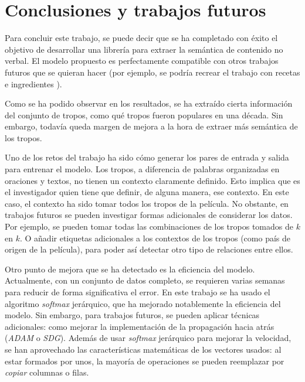 \chapter{Conclusiones y trabajos futuros}

Para concluir este trabajo, se puede decir que se ha completado con éxito el objetivo de desarrollar una librería
para extraer la semántica de contenido no verbal. El modelo propuesto es perfectamente compatible con otros trabajos
futuros que se quieran hacer (por ejemplo, se podría recrear el trabajo con recetas e ingredientes \cite{kazama2018neural}).

Como se ha podido observar en los resultados, se ha extraído cierta información del conjunto de tropos,
como qué tropos fueron populares en una década. Sin embargo, todavía
queda margen de mejora a la hora de extraer más semántica de los tropos.

Uno de los retos del trabajo ha sido cómo generar los pares de entrada y salida para entrenar el modelo. Los tropos, a diferencia de palabras organizadas en oraciones y textos,
no tienen un contexto claramente definido. Esto implica que es el investigador quien tiene que definir, de alguna manera, ese contexto. En este caso, el contexto ha sido tomar todos los tropos
de la película. No obstante, en trabajos futuros se pueden investigar formas adicionales de considerar los datos. Por ejemplo, se pueden tomar todas las combinaciones de los tropos tomados de $k$ en $k$.
O añadir etiquetas adicionales a los contextos de los tropos (como país de origen de la película), para poder así detectar otro tipo de relaciones entre ellos.

Otro punto de mejora que se ha detectado es la eficiencia del modelo. Actualmente, con un conjunto de datos completo, se requieren varias semanas
para reducir de forma significativa el error. En este trabajo se ha usado el algoritmo \textit{softmax} jerárquico, que ha mejorado notablemente la eficiencia del modelo. Sin embargo,
para trabajos futuros, se pueden aplicar técnicas adicionales: como mejorar la implementación de la propagación hacia atrás (\textit{ADAM} o \textit{SDG}). Además
de usar \textit{softmax} jerárquico para mejorar la velocidad, se han aprovechado las características matemáticas de los vectores usados: al estar formados por unos, la
mayoría de operaciones se pueden reemplazar por \textit{copiar} columnas o filas.
